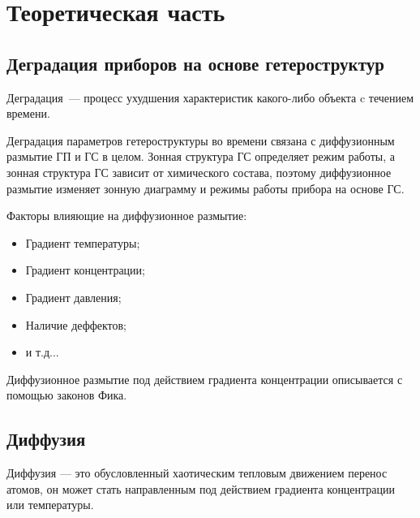 \chapter{Теоретическая часть}
\section{Деградация приборов на основе гетероструктур}
Деградация~--- процесс ухудшения характеристик какого-либо объекта c течением времени.


Деградация параметров гетероструктуры во времени связана с диффузионным размытие ГП и ГС в целом. Зонная структура ГС определяет режим работы, а зонная структура ГС зависит от химического состава, поэтому диффузионное размытие изменяет зонную диаграмму и режимы работы прибора на основе ГС.


Факторы влияющие на диффузионное размытие: 
\begin{itemize}
	\item Градиент температуры; 
	\item Градиент концентрации; 
	\item Градиент давления;
	\item Наличие деффектов;
	\item и т.д... 
\end{itemize}

Диффузионное размытие под действием градиента концентрации описывается с помощью законов Фика.

\section{Диффузия}
Диффузия — это обусловленный хаотическим тепловым движением перенос атомов, он может стать направленным под действием градиента концентрации или температуры.

